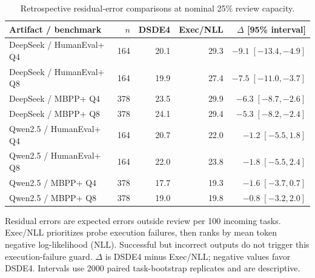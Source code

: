 \begin{table}[htbp]
\centering
\caption{Retrospective residual-error comparisons at nominal 25\% review capacity.}
\label{tab:retrospective}
\footnotesize
\begin{tabular}{lrrrr}
\toprule
Artifact / benchmark & $n$ & DSDE4 & Exec/NLL & $\Delta$ [95\% interval] \\
\midrule
DeepSeek / HumanEval+ Q4 & 164 & 20.1 & 29.3 & $-9.1\;[-13.4, -4.9]$ \\
DeepSeek / HumanEval+ Q8 & 164 & 19.9 & 27.4 & $-7.5\;[-11.0, -3.7]$ \\
DeepSeek / MBPP+ Q4 & 378 & 23.5 & 29.9 & $-6.3\;[-8.7, -2.6]$ \\
DeepSeek / MBPP+ Q8 & 378 & 24.1 & 29.4 & $-5.3\;[-8.2, -2.4]$ \\
Qwen2.5 / HumanEval+ Q4 & 164 & 20.7 & 22.0 & $-1.2\;[-5.5, 1.8]$ \\
Qwen2.5 / HumanEval+ Q8 & 164 & 22.0 & 23.8 & $-1.8\;[-5.5, 2.4]$ \\
Qwen2.5 / MBPP+ Q4 & 378 & 17.7 & 19.3 & $-1.6\;[-3.7, 0.7]$ \\
Qwen2.5 / MBPP+ Q8 & 378 & 19.0 & 19.8 & $-0.8\;[-3.2, 2.0]$ \\
\bottomrule
\end{tabular}
\par\vspace{4pt}\begin{minipage}{0.98\linewidth}\footnotesize Residual errors are expected errors outside review per 100 incoming tasks. Exec/NLL prioritizes probe execution failures, then ranks by mean token negative log-likelihood (NLL). Successful but incorrect outputs do not trigger this execution-failure guard. $\Delta$ is DSDE4 minus Exec/NLL; negative values favor DSDE4. Intervals use 2000 paired task-bootstrap replicates and are descriptive.\end{minipage}
\end{table}
